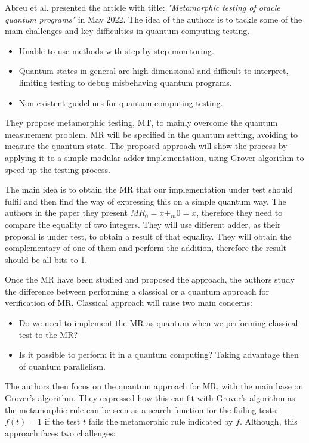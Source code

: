 \begin{itemize}
Abreu et al. presented the article with title: \textit{"Metamorphic testing of oracle quantum programs"}\cite{abreu2022metamorphic} in May 2022. The idea of the authors is to tackle some of the main challenges and key difficulties in quantum computing testing. 
\begin{itemize}
    \item Unable to use methods with step-by-step monitoring.
    \item Quantum states in general are high-dimensional and difficult to interpret, limiting testing to debug misbehaving quantum programs.
    \item Non existent guidelines for quantum computing testing.
\end{itemize}

They propose metamorphic testing, MT, to mainly overcome the quantum measurement problem. MR will be specified in the quantum setting, avoiding to measure the quantum state. The proposed approach will show the process by applying it to a simple modular adder implementation, using Grover algorithm to speed up the testing process.\newline

The main idea is to obtain the MR that our implementation under test should fulfil and then find the way of expressing this on a simple quantum way. The authors in the paper they present $MR_0=x +_m 0 = x$, therefore they need to compare the equality of two integers. They will use different adder, as their proposal is under test, to obtain a result of that equality. They will obtain the complementary of one of them and perform the addition, therefore the result should be all bits to 1. \newline

Once the MR have been studied and proposed the approach, the authors study the difference between performing a classical or a quantum approach for verification of MR. Classical approach will raise two main concerns:
\begin{itemize}
    \item Do we need to implement the MR as quantum when we performing classical test to the MR?
    \item Is it possible to perform it in a quantum computing? Taking advantage then of quantum parallelism.
\end{itemize}

The authors then focus on the quantum approach for MR, with the main base on Grover's algorithm. They expressed how this can fit with Grover's algorithm as the metamorphic rule can be seen as a search function for the failing tests: $f(t)=1$ if the test $t$ fails the metamorphic rule indicated by $f$. Although, this approach faces two challenges:


\end{itemize}
